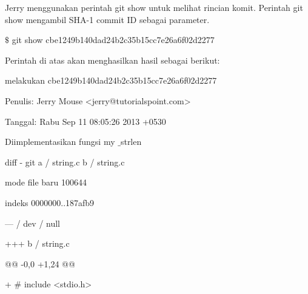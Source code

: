 \vspace{12pt}
\noindent 
 \hspace*{0.5in} Jerry menggunakan perintah git show untuk melihat rincian komit. Perintah git show mengambil SHA-1 commit ID sebagai parameter. \par
\vspace{12pt}
\noindent 
 \hspace*{0.5in}  $  \$  $ git show cbe1249b140dad24b2c35b15cc7e26a6f02d2277 \par
\vspace{12pt}
\noindent 
 \hspace*{0.5in} Perintah di atas akan menghasilkan hasil sebagai berikut: \par
\vspace{12pt}
\noindent 
 \hspace*{0.5in} melakukan cbe1249b140dad24b2c35b15cc7e26a6f02d2277 \par
\noindent 
 \hspace*{0.5in} Penulis: Jerry Mouse <jerry@tutorialspoint.com> \par
\noindent 
 \hspace*{0.5in} Tanggal: Rabu Sep 11 08:05:26 2013 +0530 \par
\vspace{12pt}
\noindent 
 \hspace*{0.5in} Diimplementasikan fungsi my $  \_  $strlen \par
\vspace{12pt}
\noindent 
 \hspace*{0.5in} diff - git a / string.c b / string.c \par
\noindent 
 \hspace*{0.5in} mode file baru 100644 \par
\noindent 
 \hspace*{0.5in} indeks 0000000..187afb9 \par
\noindent 
 \hspace*{0.5in} \vspace{12pt}
\noindent 
 \hspace*{0.5in} --- / dev / null \par
\noindent 
 \hspace*{0.5in} +++ b / string.c \par
\noindent 
 \hspace*{0.5in} @@ -0,0 +1,24 @@ \par
\noindent 
 \hspace*{0.5in} +  $  \#  $ include <stdio.h> \par
